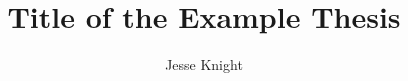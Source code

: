 \documentclass[extrawidemargins,10pt]{ut-thesis}
\author{Jesse Knight}
\title{Title of the Example Thesis}
\begin{document}
  \frontmatter
    \maketitle
    \begin{abstract}
      
    \end{abstract}
    \tableofcontents
    \listoftables
    \listoffigures
  \mainmatter
    
    
    
  \appendix
    
  \backmatter
  \printbibliography[heading=bibintoc]
  \lipsum[1-6]
\end{document}
